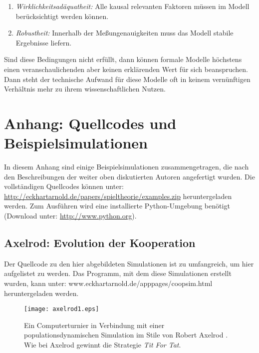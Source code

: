 \documentclass[12pt,a4paper,ngerman]{article}
\begin{document}
\begin{enumerate}

\item {\em Wirklichkeitsadäquatheit:} Alle kausal relevanten Faktoren
  müssen im Modell berücksichtigt werden können.

\item {\em Robustheit:} Innerhalb der Meßungenauigkeiten muss das
  Modell stabile Ergebnisse liefern.

\end{enumerate}

Sind diese Bedingungen nicht erfüllt, dann können formale Modelle
höchstens einen veranschaulichenden aber keinen erklärenden Wert für
sich beanspruchen. Dann steht der technische Aufwand für diese Modelle
oft in keinem vernünftigen Verhältnis mehr zu ihrem wissenschaftlichen
Nutzen.

\newpage

\section{Anhang: Quellcodes und Beispielsimulationen}

In diesem Anhang sind einige Beispielsimulationen zusammengetragen,
die nach den Beschreibungen der weiter oben diskutierten Autoren
angefertigt wurden. Die vollständigen Quellcodes können unter:
\url{http://eckhartarnold.de/papers/spieltheorie/examples.zip} heruntergeladen
werden. Zum Ausführen wird eine installierte Python-Umgebung benötigt
(Download unter: \url{http://www.python.org}).


\subsection{Axelrod: Evolution der Kooperation}
\label{Beispiele_Axelrod}

Der Quellcode zu den hier abgebildeten Simulationen ist zu umfangreich,
um hier aufgelistet zu werden. Das Programm, mit dem diese Simulationen
erstellt wurden, kann unter: www.eckhartarnold.de/apppages/coopsim.html
heruntergeladen werden.

\begin{figure}
\begin{center}
\texttt{[image: axelrod1.eps]}
\caption{\label{axelrod1} Ein Computerturnier in Verbindung mit einer
  populationsdynamischen Simulation im Stile von Robert Axelrod
  \cite{axelrod:1984}. Wie bei Axelrod gewinnt die Strategie {\em Tit
    For Tat}.}
\end{center}
\end{figure}
\end{document}
